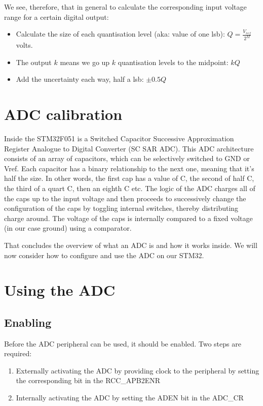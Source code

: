 We see, therefore, that in general to calculate the corresponding input voltage range for a certain digital output:
\begin{itemize}
  \item Calculate the size of each quantisation level (aka: value of one lsb): \(Q = \frac{V_{ref}}{2^M}\) volts.
  \item The output \(k\) means we go up \(k\) quantisation levels to the midpoint: \(kQ\)
  \item Add the uncertainty each way, half a lsb: \(\pm 0.5Q\)
\end{itemize}

\section{ADC calibration}
Inside the STM32F051 is a Switched Capacitor Successive Approximation Register Analogue to Digital Converter (SC SAR ADC). 
This ADC architecture consists of an array of capacitors, which can be selectively switched to GND or Vref. Each capacitor has a binary relationship to the next one, meaning that it's half the size. In other words, the first cap has a value of C, the second of half C, the third of a quart C, then an eighth C etc. 
The logic of the ADC charges all of the caps up to the input voltage and then proceeds to successively change the configuration of the caps by toggling internal switches, thereby distributing charge around.
The voltage of the caps is internally compared to a fixed voltage (in our case ground) using a comparator.


That concludes the overview of what an ADC is and how it works inside. We will now consider how to configure and use the ADC on our STM32.

\section{Using the ADC}
\subsection{Enabling}
Before the ADC peripheral can be used, it should be enabled. Two steps are required: 
\begin{enumerate}
\item Externally activating the ADC by providing clock to the peripheral by setting the corresponding bit in the RCC\_APB2ENR
\item Internally activating the ADC by setting the ADEN bit in the ADC\_CR
\end{enumerate}

